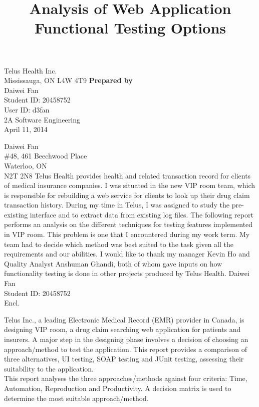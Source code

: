 \documentclass[12pt]{article}
\begin{document}
\title{Analysis of Web Application Functional Testing Options}
{
	Telus Health Inc.\\
	Mississauga, ON L4W 4T9
}
{
	\textbf{Prepared by}\\[2ex]
	
	Daiwei Fan\\
	Student ID: 20458752\\
	User ID: d3fan\\
	2A Software Engineering\\
	April 11, 2014
}


{
	\noindent
	Daiwei Fan\\
	\#48, 461 Beechwood Place\\
	Waterloo, ON\\
	N2T 2N8
}
{
	Telus Health provides health and related transaction record for clients of medical insurance companies. I was situated in the new VIP room team, which is responsible for rebuilding a web service for clients to look up their drug claim transaction history. During my time in Telus, I was assigned to study the pre-existing interface and to extract data from existing log files.
}
{
	The following report performs an analysis on the different techniques for testing features implemented in VIP room. This problem is one that I encountered during my work term. My team had to decide which method was best suited to the task given all the requirements and our abilities.
}
{
	I would like to thank my manager Kevin Ho and Quality Analyst Anshuman Ghandi, both of whom gave inputs on how functionality testing is done in other projects produced by Telus Health.
}
{
	Daiwei Fan\\
	Student ID: 20458752\\[2ex]
	Encl.
}


Telus Inc., a leading Electronic Medical Record (EMR) provider in Canada, is designing VIP room, a drug claim searching web application for patients and insurers. A major step in the designing phase involves a 
decision of choosing an approach/method to test the application. This report provides a comparison of three 
alternatives, UI testing, SOAP testing and JUnit testing, assessing their suitability to the application.\\

This report analyses the three approaches/methods against four criteria: Time, Automation, Reproduction and Productivity. A decision matrix is used to determine the most suitable approach/method.\\
\end{document}
